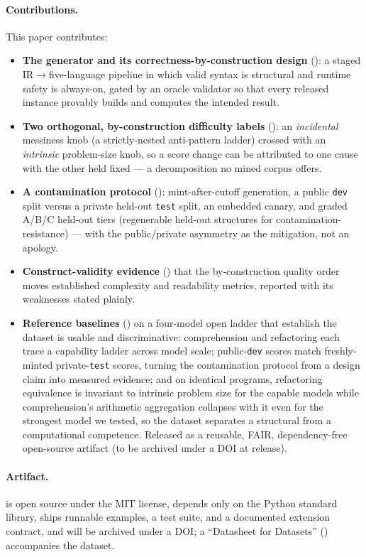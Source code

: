 \paragraph{Contributions.} This paper contributes:
\begin{itemize}
  \item \textbf{The generator and its correctness-by-construction design}
        (): a staged IR$\rightarrow$five-language pipeline in which
        valid syntax is structural and runtime safety is always-on, gated by an oracle
        validator so that every released instance provably builds and computes the
        intended result.
  \item \textbf{Two orthogonal, by-construction difficulty labels}
        (): an \emph{incidental} messiness knob (a strictly-nested
        anti-pattern ladder) crossed with an \emph{intrinsic} problem-size knob, so a
        score change can be attributed to one cause with the other held fixed --- a
        decomposition no mined corpus offers.
  \item \textbf{A contamination protocol} (): mint-after-cutoff
        generation, a public \texttt{dev} split versus a private held-out \texttt{test}
        split, an embedded canary, and graded A/B/C held-out tiers (regenerable held-out
        structures for contamination-resistance) --- with the public/private asymmetry as
        the mitigation, not an apology.
  \item \textbf{Construct-validity evidence} () that the
        by-construction quality order moves established complexity and readability
        metrics, reported with its weaknesses stated plainly.
  \item \textbf{Reference baselines} () on a four-model open ladder
        that establish the dataset is usable and discriminative: comprehension and
        refactoring each trace a capability ladder across model scale; public-\texttt{dev}
        scores match freshly-minted private-\texttt{test} scores, turning the contamination
        protocol from a design claim into measured evidence; and on identical programs,
        refactoring equivalence is invariant to intrinsic problem size for the capable models
        while comprehension's
        arithmetic aggregation collapses with it even for the strongest model we tested, so the dataset
        separates a structural from a computational competence. Released as a reusable, FAIR,
        dependency-free open-source artifact (to be archived under a DOI at release).
\end{itemize}

\paragraph{Artifact.} \tool{} is open source under the MIT license, depends only on the
Python standard library, ships runnable examples, a test suite, and a documented
extension contract, and will be archived under a DOI; a ``Datasheet for Datasets''
() accompanies the dataset.
